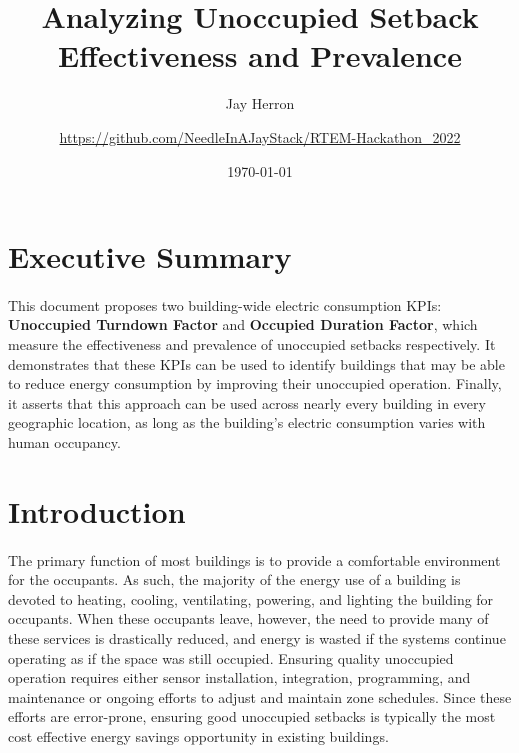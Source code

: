 \documentclass[a4paper]{article}
\begin{document}
\begin{titlepage}
\title{Analyzing Unoccupied Setback Effectiveness and Prevalence}
\author{
	Jay Herron
	\and
	\url{https://github.com/NeedleInAJayStack/RTEM-Hackathon\_2022}
}
\date{\today}
\maketitle
\end{titlepage}

\section*{Executive Summary}

\paragraph{}
This document proposes two building-wide electric consumption KPIs: \textbf{Unoccupied Turndown Factor} and \textbf{Occupied Duration Factor}, which measure the effectiveness and prevalence of unoccupied setbacks respectively. It demonstrates that these KPIs can be used to identify buildings that may be able to reduce energy consumption by improving their unoccupied operation.  Finally, it asserts that this approach can be used across nearly every building in every geographic location, as long as the building's electric consumption varies with human occupancy.

\pagebreak

\section{Introduction}

\paragraph{}
The primary function of most buildings is to provide a comfortable environment for the occupants. As such, the majority of the energy use of a building is devoted to heating, cooling, ventilating, powering, and lighting the building for occupants. When these occupants leave, however, the need to provide many of these services is drastically reduced, and energy is wasted if the systems continue operating as if the space was still occupied. Ensuring quality unoccupied operation requires either sensor installation, integration, programming, and maintenance or ongoing efforts to adjust and maintain zone schedules. Since these efforts are error-prone, ensuring good unoccupied setbacks is typically the most cost effective energy savings opportunity in existing buildings.
\end{document}
